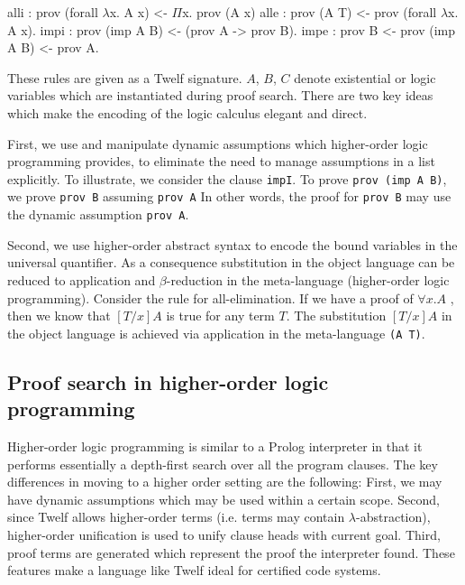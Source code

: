 \documentclass{acmconf}
\newcommand{\z}{\mbox{}}
\begin{document}
\begin{code}
alli   : prov (forall $\lambda$x. A x)
            <- $\Pi$x. prov (A x)
alle   : prov (A T)
            <- prov (forall $\lambda$x. A x).
\z
impi     : prov (imp A B)
            <- (prov A -> prov B).
impe     : prov B
            <- prov (imp A B)
            <- prov A.
\end{code}


These rules are given as a Twelf signature. $A$, $B$, $C$ denote
existential or logic variables which are instantiated during proof
search. There are two key ideas which make the encoding of the logic
calculus elegant and direct.

First, we use and manipulate dynamic assumptions which higher-order
logic programming provides, to eliminate the need to manage
assumptions in a list explicitly. To illustrate, we consider the
clause {\tt impI}. To prove {\tt prov (imp A B)}, we prove {\tt prov
B} assuming {\tt prov A} In other words, the proof for {\tt prov B}
may use the dynamic assumption {\tt prov A}.

Second, we use higher-order abstract syntax to encode the bound
variables in the universal quantifier. As a consequence substitution
in the object language can be reduced to application and
$\beta$-reduction in the meta-language (higher-order logic
programming). Consider the rule for all-elimination. If we have a proof of
$\forall x.A$ , then we know that $[T/x]A$ is true for any term
$T$. The substitution $[T/x]A$ in the object language is achieved via
application in the meta-language {\tt (A T)}. 


\subsection{Proof search in higher-order logic programming}

Higher-order logic programming is similar to a Prolog interpreter in
that it performs essentially a depth-first search over all the program
clauses. The key differences in moving to a higher order setting are
the following: First, we may have dynamic assumptions which may be
used within a certain scope. Second, since Twelf allows higher-order
terms (i.e. terms may contain $\lambda$-abstraction), higher-order
unification is used to unify clause heads with current goal. Third,
proof terms are generated which represent the proof the interpreter
found. These features make a language like Twelf ideal for certified
code systems.
\end{document}
